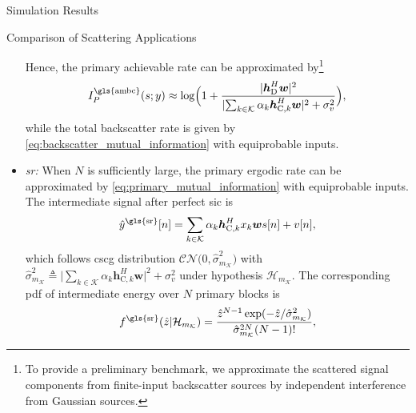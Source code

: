 \documentclass[journal]{IEEEtran}
\begin{document}
\begin{section}{Simulation Results}
\begin{subsection}{Comparison of Scattering Applications}
\begin{itemize}
			Hence, the primary achievable rate can be approximated by\footnote{To provide a preliminary benchmark, we approximate the scattered signal components from finite-input backscatter sources by independent interference from Gaussian sources.}
			\begin{equation}
				I_P^{\text{\gls{ambc}}}(s;y) \approx \log \Bigl(1 + \frac{\lvert\boldsymbol{h}_{\mathrm{D}}^H\boldsymbol{w}\rvert^2}{\lvert\sum_{k \in \mathcal{K}} \alpha_k \boldsymbol{h}_{\mathrm{C},k}^H \boldsymbol{w}\rvert^2+\sigma_v^2}\Bigr),
			\end{equation}
			while the total backscatter rate is given by \eqref{eq:backscatter_mutual_information} with equiprobable inputs.
			\item \emph{\gls{sr}:} When $N$ is sufficiently large, the primary ergodic rate can be approximated by \eqref{eq:primary_mutual_information} with equiprobable inputs.
			The intermediate signal after perfect \gls{sic} is \cite{Long2020a}
			\begin{equation}
				\hat{y}^{\text{\gls{sr}}}[n] = \sum_{k \in \mathcal{K}} \alpha_k \boldsymbol{h}_{\mathrm{C},k}^H x_k \boldsymbol{w} s[n] + v[n],
			\end{equation}
			which follows \gls{cscg} distribution $\mathcal{CN}\bigl(0,\hat{\sigma}_{m_{\mathcal{K}}}^2\bigr)$ with $\hat{\sigma}_{m_{\mathcal{K}}}^2 \triangleq \lvert\sum_{k \in \mathcal{K}} \alpha_k \boldsymbol{h}_{\mathrm{C},k}^H \boldsymbol{w}\rvert^2+\sigma_v^2$ under hypothesis $\mathcal{H}_{m_{\mathcal{K}}}$.
			The corresponding \gls{pdf} of intermediate energy over $N$ primary blocks is
			\begin{equation}
				f^{\text{\gls{sr}}}(\hat{z}|\mathcal{H}_{m_{\mathcal{K}}}) = \frac{\hat{z}^{N-1} \exp(-\hat{z}/\hat{\sigma}_{m_{\mathcal{K}}}^2)}{\hat{\sigma}_{m_{\mathcal{K}}}^{2N} (N-1)!},
			\end{equation}
		\end{itemize}
	\end{subsection}


\end{section}
\end{document}

